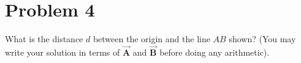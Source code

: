 \section*{Problem 4}

What is the distance \( d \) between the origin and the line \( AB \) shown?
(You may write your solution in terms of \( \vec{\mathbf{A}} \) and \( \vec{\mathbf{B}} \) before doing any arithmetic).
